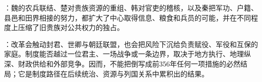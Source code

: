 \begin{turningpoint}
：魏的农兵联结、楚对贵族资源的重组、韩对官吏的稽核，以及秦把军功、户籍、县邑和田界相接的努力，都扩大了中心取得信息、粮食和兵员的可能，并在不同程度上压缩了旧贵族对公共权力的独占。

：改革会触动封君、世卿与朝廷联盟，也会把风险下沉给负责赋役、军役和互保的家庭。制度能否越过一位君主、一场战争或一条边界，取决于地方执行、地理纵深、财政供给和外部竞争。因而，不能把倒写成前356年任何一项措施的必然结局；它是制度路径在后续统治、资源与列国关系中累积出的结果。
\end{turningpoint}


